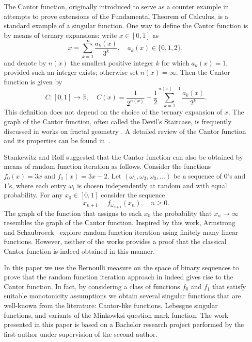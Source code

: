 \documentclass[a4paper,12pt]{article}
\begin{document}
The Cantor function, originally introduced to serve as a counter example in attempts to prove extensions of the Fundamental Theorem of Calculus, is a standard example of a singular function. One way to define the Cantor function is by means of ternary expansions: write $x \in [0,1]$ as
\[
x = \sum_{k=1}^\infty \frac{a_k(x)}{3^k}, \quad a_k(x) \in \{0,1,2\},
\]
and denote by $n(x)$ the smallest positive integer $k$ for which $a_{k}(x)=1$, provided such an integer exists; otherwise set $n(x)=\infty$. Then the Cantor function is given by
\begin{equation}
\label{eq:cantor_function}
C : [0,1] \to \mathbb{R}, \quad
C(x) = \frac{1}{2^{n(x)}} + \frac{1}{2}\sum_{k=1}^{n(x)-1} \frac{a_k(x)}{2^k}.
\end{equation}
This definition does not depend on the choice of the ternary expansion of $x$. The graph of the Cantor function, often called the Devil's Staircase, is frequently discussed in works on fractal geometry \cite{Berger:2001, Helmberg:2007, PJS:2004}. A detailed review of the Cantor function and its properties can be found in~\cite{Dovgoshey:2006}.

Stankewitz and Rolf \cite{StankewitzRolf:2012} suggested that the Cantor function can also be obtained by means of random function iteration as follows. Consider the functions $f_0(x) = 3x$ and $f_1(x) = 3x-2$. Let $(\omega_1,\omega_2,\omega_3,\dots)$ be a sequence of $0$'s and $1$'s, where each entry $\omega_i$ is chosen independently at random and with equal probability. For any $x_0 \in [0,1]$ consider the sequence
\[
x_{n+1} = f_{\omega_{n+1}}(x_n), \quad n\geq 0.
\]
The graph of the function that assigns to each $x_0$ the probability that $x_n \to \infty$ resembles the graph of the Cantor function.  Inspired by this work, Armstrong and Schaubroeck~\cite{ArmstrongSchaubroeck:2020} explore random function iteration using finitely many linear functions. However, neither of the works \cite{ArmstrongSchaubroeck:2020, StankewitzRolf:2012} provides a proof that the classical Cantor function is indeed obtained in this manner.

In this paper we use the Bernoulli measure on the space of binary sequences to prove that the random function iteration approach in \cite{StankewitzRolf:2012} indeed gives rise to the Cantor function. In fact, by considering a class of functions $f_0$ and $f_1$ that satisfy suitable monotonicity assumptions we obtain several singular functions that are well-known from the literature: Cantor-like functions, Lebesgue singular functions, and variants of the Minkowksi question mark function. The work presented in this paper is based on a Bachelor research project performed by the first author \cite{Mitrea:2025} under supervision of the second author.
\end{document}

